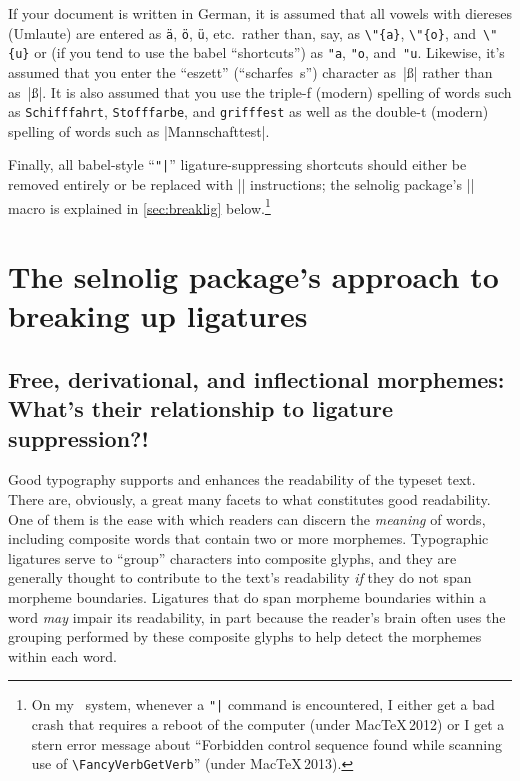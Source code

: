 \documentclass[11pt]{article}
\newcommand{\pkg}[1]{\textsf{#1}}
\newcommand{\cmmd}[1]{\texttt{\textbackslash #1}}
\begin{document}
If your document is written in German, it is assumed that all vowels with diereses (Umlaute) are entered as \Verb|ä|, \Verb|ö|, \Verb|ü|, etc.\ rather than, say, as \Verb|\"{a}|, \Verb|\"{o}|, and~\Verb|\"{u}| or (if you tend to use the \pkg{babel} \enquote{shortcuts}) as \Verb|"a|, \Verb|"o|, and~\Verb|"u|. Likewise, it's assumed that you enter the \enquote{eszett} (\enquote{scharfes~s}) character as~|ß| rather than as~|\ss|.
It is also assumed that you use the triple-f (modern) spelling of words such as \texttt{Schifffahrt}, \texttt{Stofffarbe}, and \texttt{grifffest} as well as the double-t (modern) spelling of words such as |Mannschafttest|.

Finally, all \pkg{babel}-style ``\Verb+"|+'' ligature-suppressing shortcuts should either be removed entirely or be replaced with |\breaklig| instructions; the \pkg{selnolig} package's |\breaklig| macro is explained in \cref{sec:breaklig} below.\footnote{On my \LuaLaTeX\ system, whenever a \Verb+"|+ command is encountered, I either get a bad crash that requires a reboot of the computer (under Mac\TeX\,2012) or I get a stern error message about \enquote{Forbidden control sequence found while scanning use of \cmmd{FancyVerbGetVerb}} (under Mac\TeX\,2013).}





\section[The selnolig package's approach to breaking up ligatures]{The \pkg{selnolig} package's approach to breaking up ligatures}

\subsection[Free, derivational, and inflectional morphemes]{Free, derivational, and inflectional morphemes: What's their relationship to ligature suppression?!}


Good typography supports and enhances the readability of the typeset text. There are, obviously, a great many facets to what constitutes good readability. One of them is the ease with which readers can discern the \emph{meaning} of words, including composite words that contain two or more morphemes. Typographic ligatures serve to \enquote{group} characters into composite glyphs, and they are generally thought to contribute to the text's readability \emph{if} they do not span morpheme boundaries. Ligatures that do span morpheme boundaries within a word \emph{may} impair its readability, in part because the reader's brain often uses the grouping performed by these composite glyphs to help detect the morphemes within each word.
\end{document}
